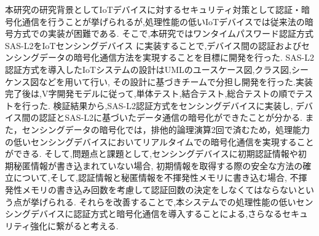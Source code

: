
本研究の研究背景としてIoTデバイスに対するセキュリティ対策として認証・暗号化通信を行うことが挙げられるが,処理性能の低いIoTデバイスでは従来法の暗号方式での実装が困難である.
そこで,本研究ではワンタイムパスワード認証方式SAS-L2をIoTセンシングデバイス
に実装することで,デバイス間の認証およびセンシングデータの暗号化通信方法を実現することを目標に開発を行った.
SAS-L2認証方式を導入したIoTシステムの設計はUMLのユースケース図,クラス図,シーケンス図などを用いて行い,
その設計に基づきチームで分担し開発を行った.実装完了後は,V字開発モデルに従って,単体テスト,結合テスト,総合テストの順でテストを行った.
検証結果から,SAS-L2認証方式をセンシングデバイスに実装し,
デバイス間の認証とSAS-L2に基づいたデータ通信の暗号化ができたことが分かる.
また，センシングデータの暗号化では，排他的論理演算2回で済むため，処理能力の低いセンシングデバイスにおいてリアルタイムでの暗号化通信を実現することができる.
そして,問題点と課題として,センシングデバイスに初期認証情報や初期秘匿情報が書き込まれていない場合,
初期情報を取得する際の安全な方法の確立について,そして,認証情報と秘匿情報を不揮発性メモリに書き込む場合,
不揮発性メモリの書き込み回数を考慮して認証回数の決定をしなくてはならないという点が挙げられる.
それらを改善することで,本システムでの処理性能の低いセンシングデバイスに認証方式と暗号化通信を導入することによる,さらなるセキュリティ強化に繋がると考える.
